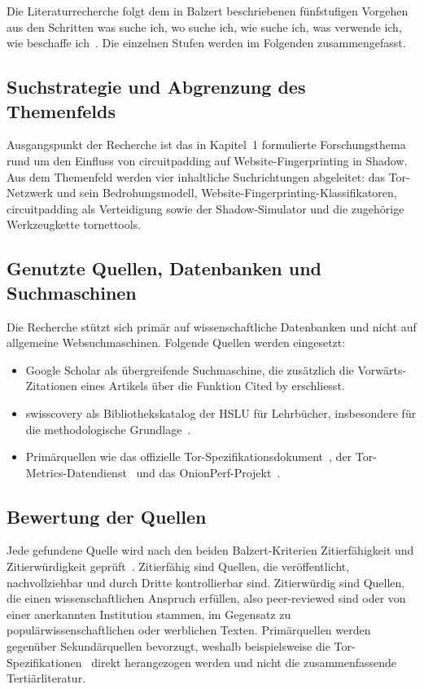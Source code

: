 Die Literaturrecherche folgt dem in Balzert beschriebenen fünfstufigen Vorgehen aus den Schritten was suche ich, wo suche ich, wie suche ich, was verwende ich, wie beschaffe ich~\cite{book}.
Die einzelnen Stufen werden im Folgenden zusammengefasst.

\subsection{Such\-strategie und Abgrenzung des Themenfelds}
\label{sec:literaturrecherche_strategie}

Ausgangspunkt der Recherche ist das in Kapitel~1 formulierte Forschungsthema rund um den Einfluss von \gls{circuitpadding} auf Website-Fingerprinting in Shadow.
Aus dem Themenfeld werden vier inhaltliche Suchrichtungen abgeleitet: das Tor-Netzwerk und sein Bedrohungsmodell, Website-Fingerprinting-Klassifikatoren, \gls{circuitpadding} als Verteidigung sowie der Shadow-Simulator und die zugehörige Werkzeugkette tornettools.

\subsection{Genutzte Quellen, Datenbanken und Suchmaschinen}
\label{sec:literaturrecherche_quellen}

Die Recherche stützt sich primär auf wissenschaftliche Datenbanken und nicht auf allgemeine Websuchmaschinen.
Folgende Quellen werden eingesetzt:

\begin{itemize}
    \item Google Scholar als übergreifende Suchmaschine, die zusätzlich die Vorwärts-Zitationen eines Artikels über die Funktion Cited by erschliesst.
    \item swisscovery als Bibliothekskatalog der HSLU für Lehrbücher, insbesondere für die methodologische Grundlage~\cite{book}.
    \item Primärquellen wie das offizielle Tor-Spezifikationsdokument~\cite{torspec_dirspec}, der Tor-Metrics-Datendienst~\cite{tormetricsabout} und das OnionPerf-Projekt~\cite{onionperf}.
\end{itemize}


\subsection{Bewertung der Quellen}
\label{sec:literaturrecherche_bewertung}

Jede gefundene Quelle wird nach den beiden Balzert-Kriterien Zitierfähigkeit und Zitierwürdigkeit geprüft~\cite{book}.
Zitierfähig sind Quellen, die veröffentlicht, nachvollziehbar und durch Dritte kontrollierbar sind.
Zitierwürdig sind Quellen, die einen wissenschaftlichen Anspruch erfüllen, also peer-reviewed sind oder von einer anerkannten Institution stammen, im Gegensatz zu populärwissenschaftlichen oder werblichen Texten.
Primärquellen werden gegenüber Sekundärquellen bevorzugt, weshalb beispielsweise die Tor-Spezifikationen~\cite{torspec_dirspec} direkt herangezogen werden und nicht die zusammenfassende Tertiärliteratur.

